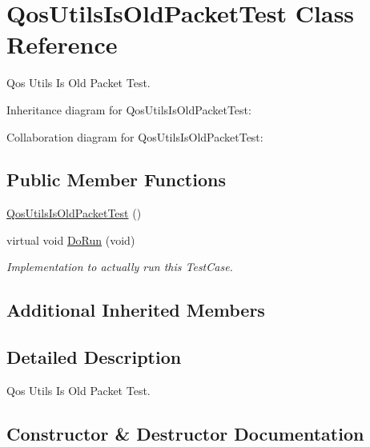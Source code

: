 \hypertarget{classQosUtilsIsOldPacketTest}{}\section{Qos\+Utils\+Is\+Old\+Packet\+Test Class Reference}
\label{classQosUtilsIsOldPacketTest}


Qos Utils Is Old Packet Test.  




Inheritance diagram for Qos\+Utils\+Is\+Old\+Packet\+Test\+:


Collaboration diagram for Qos\+Utils\+Is\+Old\+Packet\+Test\+:
\subsection*{Public Member Functions}
\begin{DoxyCompactItemize}
\item 
\hyperlink{classQosUtilsIsOldPacketTest_adf6f736c0007e810f2778e46004719bb}{Qos\+Utils\+Is\+Old\+Packet\+Test} ()
\item 
virtual void \hyperlink{classQosUtilsIsOldPacketTest_a2ec05f8492069248e887b19818581d1f}{Do\+Run} (void)
\begin{DoxyCompactList}\small\item\em Implementation to actually run this Test\+Case. \end{DoxyCompactList}\end{DoxyCompactItemize}
\subsection*{Additional Inherited Members}


\subsection{Detailed Description}
Qos Utils Is Old Packet Test. 

\subsection{Constructor \& Destructor Documentation}
